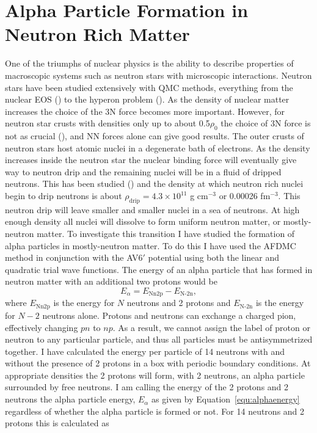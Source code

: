 \chapter{Alpha Particle Formation in Neutron Rich Matter}
One of the triumphs of nuclear physics is the ability to describe properties of macroscopic systems such as neutron stars with microscopic interactions. Neutron stars have been studied extensively with QMC methods, everything from the nuclear EOS (\cite{sarsa2003,gandolfi2014}) to the hyperon problem (\cite{lonardoni2015,gandolfi2018}). As the density of nuclear matter increases the choice of the 3N force becomes more important. However, for neutron star crusts with densities only up to about 0.5$\rho_0$ the choice of 3N force is not as crucial (\cite{gandolfi2009}), and NN forces alone can give good results. The outer crusts of neutron stars host atomic nuclei in a degenerate bath of electrons. As the density increases inside the neutron star the nuclear binding force will eventually give way to neutron drip and the remaining nuclei will be in a fluid of dripped neutrons. This has been studied (\cite{lorenz1993,chamel2015}) and the density at which neutron rich nuclei begin to drip neutrons is about $\rho_\text{drip} = 4.3\times10^{11}$ g cm$^{-3}$ or 0.00026 fm$^{-3}$. This neutron drip will leave smaller and smaller nuclei in a sea of neutrons. At high enough density all nuclei will dissolve to form uniform neutron matter, or mostly-neutron matter. To investigate this transition I have studied the formation of alpha particles in mostly-neutron matter. To do this I have used the AFDMC method in conjunction with the AV6$'$ potential using both the linear and quadratic trial wave functions. The energy of an alpha particle that has formed in neutron matter with an additional two protons would be
\begin{equation}
   E_\alpha = E_\text{Nn2p} - E_\text{N-2n},
   \label{equ:alphaenergy}
\end{equation}
where $E_\text{Nn2p}$ is the energy for $N$ neutrons and 2 protons and $E_\text{N-2n}$ is the energy for $N-2$ neutrons alone. Protons and neutrons can exchange a charged pion, effectively changing $pn$ to $np$. As a result, we cannot assign the label of proton or neutron to any particular particle, and thus all particles must be antisymmetrized together. I have calculated the energy per particle of 14 neutrons with and without the presence of 2 protons in a box with periodic boundary conditions. At appropriate densities the 2 protons will form, with 2 neutrons, an alpha particle surrounded by free neutrons. I am calling the energy of the 2 protons and 2 neutrons the alpha particle energy, $E_\alpha$ as given by Equation~\ref{equ:alphaenergy} regardless of whether the alpha particle is formed or not. For 14 neutrons and 2 protons this is calculated as

